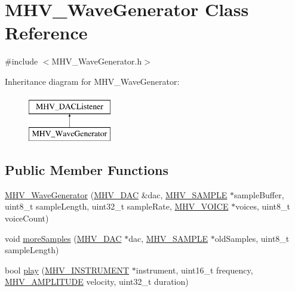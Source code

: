 \hypertarget{class_m_h_v___wave_generator}{
\section{\-M\-H\-V\-\_\-\-Wave\-Generator \-Class \-Reference}
\label{class_m_h_v___wave_generator}
}


{\ttfamily \#include $<$\-M\-H\-V\-\_\-\-Wave\-Generator.\-h$>$}

\-Inheritance diagram for \-M\-H\-V\-\_\-\-Wave\-Generator\-:\begin{figure}[H]
\begin{center}
\leavevmode
\includegraphics[height=2.000000cm]{class_m_h_v___wave_generator}
\end{center}
\end{figure}
\subsection*{\-Public \-Member \-Functions}
\begin{DoxyCompactItemize}
\item 
\hyperlink{class_m_h_v___wave_generator_a00832ec1568e58f54dc4e4cb1b7399b6}{\-M\-H\-V\-\_\-\-Wave\-Generator} (\hyperlink{class_m_h_v___d_a_c}{\-M\-H\-V\-\_\-\-D\-A\-C} \&dac, \hyperlink{_m_h_v___d_a_c_8h_a5ed12db0bcd6a3870733daecfb30e640}{\-M\-H\-V\-\_\-\-S\-A\-M\-P\-L\-E} $\ast$sample\-Buffer, uint8\-\_\-t sample\-Length, uint32\-\_\-t sample\-Rate, \hyperlink{_m_h_v___wave_generator_8h_a6e1f0fc3a346e43815c488947b5887f0}{\-M\-H\-V\-\_\-\-V\-O\-I\-C\-E} $\ast$voices, uint8\-\_\-t voice\-Count)
\item 
void \hyperlink{class_m_h_v___wave_generator_a57d400e9427c7cfb38c6700c202998e5}{more\-Samples} (\hyperlink{class_m_h_v___d_a_c}{\-M\-H\-V\-\_\-\-D\-A\-C} $\ast$dac, \hyperlink{_m_h_v___d_a_c_8h_a5ed12db0bcd6a3870733daecfb30e640}{\-M\-H\-V\-\_\-\-S\-A\-M\-P\-L\-E} $\ast$old\-Samples, uint8\-\_\-t sample\-Length)
\item 
bool \hyperlink{class_m_h_v___wave_generator_ae9e9adfb5c34e678a3cf24d8971997b0}{play} (\hyperlink{_m_h_v___wave_generator_8h_ad8420c0a6c4bf917359c2c4f2e7720d3}{\-M\-H\-V\-\_\-\-I\-N\-S\-T\-R\-U\-M\-E\-N\-T} $\ast$instrument, uint16\-\_\-t frequency, \hyperlink{_m_h_v___wave_generator_8h_ae0ff00bbcfd596fc3d6afab09bb5e11c}{\-M\-H\-V\-\_\-\-A\-M\-P\-L\-I\-T\-U\-D\-E} velocity, uint32\-\_\-t duration)
\end{DoxyCompactItemize}


